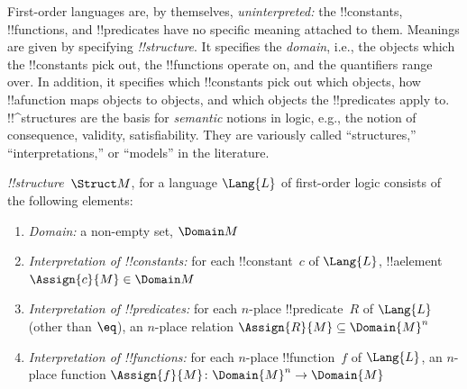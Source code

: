 
\begin{explain}
First-order languages are, by themselves, \emph{uninterpreted:} the
!!{constant}s, !!{function}s, and !!{predicate}s have no specific
meaning attached to them.  Meanings are given by specifying
 \emph{!!{structure}}. It specifies the
\emph{domain}, i.e., the objects which the !!{constant}s pick out, the
!!{function}s operate on, and the quantifiers range over. In addition,
it specifies which !!{constant}s pick out which objects, how
!!a{function} maps objects to objects, and which objects the
!!{predicate}s apply to.  !!^{structure}s are the basis for
\emph{semantic} notions in logic, e.g., the notion of consequence,
validity, satisfiability. They are variously called ``structures,''
``interpretations,'' or ``models'' in the literature.
\end{explain}

\begin{defn}[!!^{structure}s]
 \emph{!!{structure}}~$\Struct M$, for a language
$\Lang{L}$ of first-order logic consists of the following elements:
\begin{enumerate}
\item \emph{Domain:} a non-empty set, $\Domain M$
\item \emph{Interpretation of !!{constant}s:} for each !!{constant}~$c$ of
  $\Lang{L}$, !!a{element} $\Assign{c}{M} \in \Domain M$
\item \emph{Interpretation of !!{predicate}s:} for each $n$-place
  !!{predicate}~$R$ of $\Lang{L}$ (other than $\eq$), an $n$-place
  relation $\Assign{R}{M} \subseteq \Domain{M}^n$
\item \emph{Interpretation of !!{function}s:} for each $n$-place
  !!{function}~$f$ of $\Lang{L}$, an $n$-place function $\Assign{f}{M}
  \colon \Domain{M}^n \to \Domain{M}$
\end{enumerate}
\end{defn}

